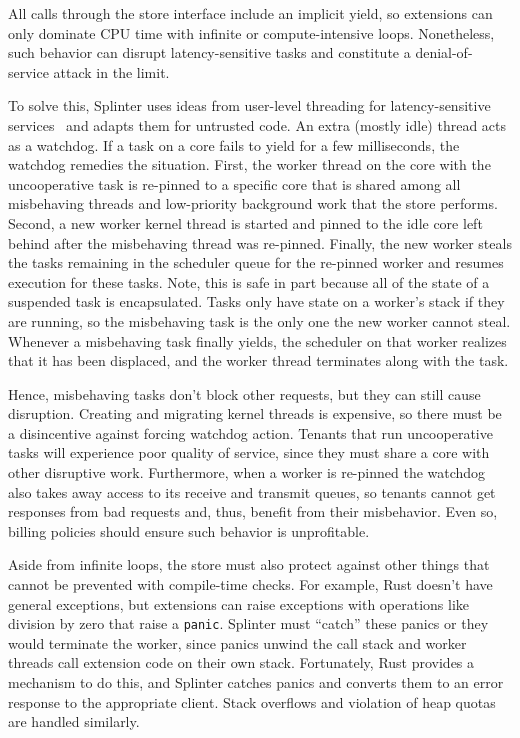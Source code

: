 All calls through the store interface include an implicit yield, so extensions
  can only dominate CPU time with infinite or compute-intensive loops.
Nonetheless, such behavior can disrupt latency-sensitive tasks and constitute a
  denial-of-service attack in the limit.

To solve this, Splinter uses ideas from user-level threading for
  latency-sensitive services~\cite{arachne-2018} and adapts them for
  untrusted code.
An extra (mostly idle) thread acts as a watchdog.
If a task on a core fails to yield for a few milliseconds, the watchdog
  remedies the situation.
First, the worker thread on the core with the uncooperative task is
  re-pinned to a specific core that is shared among all misbehaving threads
  and low-priority background work that the store performs.
Second, a new worker kernel thread is started and pinned to the idle core left behind
  after the misbehaving thread was re-pinned.
Finally, the new worker steals the tasks remaining in the scheduler queue for
  the re-pinned worker and resumes execution for these tasks.
Note, this is safe in part because all of the state of a suspended task is
  encapsulated.
Tasks only have state on a worker's stack if they are running, so
  the misbehaving task is the only one the new worker cannot steal.
Whenever a misbehaving task finally yields, the scheduler on that worker realizes
  that it has been displaced, and the worker thread terminates along with the task.

Hence, misbehaving tasks don't block other requests, but they can still cause
  disruption.
Creating and migrating kernel threads is expensive,
  so there must be a disincentive against forcing watchdog action.
Tenants that run uncooperative tasks will experience poor quality of
  service, since they must share a core with other disruptive
  work.
Furthermore, when a worker is re-pinned the watchdog also takes away access to its
  receive and transmit queues, so tenants cannot get responses from bad
  requests and, thus, benefit from their misbehavior.
Even so, billing policies should ensure such behavior is unprofitable.

Aside from infinite loops, the store must also
  protect against other things that cannot be prevented with compile-time checks.
For example, Rust doesn't have general exceptions, but
  extensions can raise exceptions with operations like division by
  zero that raise a \texttt{panic}.
Splinter must ``catch'' these panics or they would terminate the worker,
  since panics unwind the call stack and worker threads call
  extension code on their own stack.
Fortunately, Rust provides a mechanism to do this, and Splinter catches
    panics and converts them to an error response to the appropriate client.
Stack overflows and violation of heap quotas are handled similarly.


